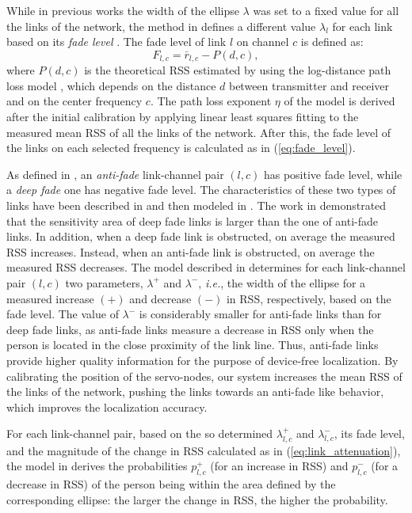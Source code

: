 \documentclass[conference]{IEEEtran}
\begin{document}
While in previous works the width of the ellipse $\lambda$ was set to a fixed value for all the links of the network, the method in \cite{multi_scale_arxiv} defines a different value $\lambda_{l}$ for each link based on its \emph{fade level} \cite{Wilson_SkewL_2011}. The fade level of link $l$ on channel $c$ is defined as:
\begin{equation} \label{eq:fade_level}
    F_{l,c} = \bar{r}_{l,c} - P(d,c),
\end{equation}
where $P(d,c)$ is the theoretical RSS estimated by using the log-distance path loss model \cite{Rappaport_book}, which depends on the distance $d$ between transmitter and receiver and on the center frequency $c$. The path loss exponent $\eta$ of the model is derived after the initial calibration by applying linear least squares fitting to the measured mean RSS of all the links of the network. After this, the fade level of the links on each selected frequency is calculated as in (\ref{eq:fade_level}).

As defined in \cite{Wilson_SkewL_2011}, an \emph{anti-fade} link-channel pair $(l,c)$ has positive fade level, while a \emph{deep fade} one has negative fade level. The characteristics of these two types of links have been described in \cite{Wilson_SkewL_2011} and then modeled in \cite{multi_scale_arxiv}. The work in \cite{Wilson_SkewL_2011} demonstrated that the sensitivity area of deep fade links is larger than the one of anti-fade links. In addition, when a deep fade link is obstructed, on average the measured RSS increases. Instead, when an anti-fade link is obstructed, on average the measured RSS decreases. The model described in \cite{multi_scale_arxiv} determines  for each link-channel pair $(l,c)$ two parameters, $\lambda^{+}$ and $\lambda^{-}$, \emph{i.e.}, the width of the ellipse for a measured increase $(+)$ and decrease $(-)$ in RSS, respectively, based on the fade level. The value of $\lambda^{-}$ is considerably smaller for anti-fade links than for deep fade links, as anti-fade links measure a decrease in RSS only when the person is located in the close proximity of the link line. Thus, anti-fade links provide higher quality information for the purpose of device-free localization. By calibrating the position of the servo-nodes, our system increases the mean RSS of the links of the network, pushing the links towards an anti-fade like behavior, which improves the localization accuracy.

For each link-channel pair, based on the so determined $\lambda^{+}_{l,c}$ and $\lambda^{-}_{l,c}$, its fade level, and the magnitude of the change in RSS calculated as in (\ref{eq:link_attenuation}), the model in \cite{multi_scale_arxiv} derives the probabilities $p^{+}_{l,c}$ (for an increase in RSS) and $p^{-}_{l,c}$ (for a decrease in RSS) of the person being within the area defined by the corresponding ellipse: the larger the change in RSS, the higher the probability.
\end{document}
